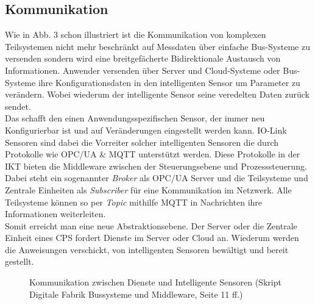 \documentclass[a4paper,12pt]{scrartcl}
\begin{document}
\subsection{Kommunikation}
Wie in Abb. 3 schon illustriert ist die Kommunikation von komplexen Teilsystemen nicht mehr beschränkt auf Messdaten über einfache Bus-Systeme zu versenden sondern wird eine breitgefächerte Bidirektionale Austausch von Informationen. Anwender versenden über Server und Cloud-Systeme oder Bus-Systeme ihre Konfigurationsdaten in den intelligenten Sensor um Parameter zu verändern. Wobei wiederum der intelligente Sensor seine veredelten Daten zurück sendet.\\
\cite[14 ff.]{Furstenberg.2016}
Das schafft den einen Anwendungsspezifischen Sensor, der immer neu Konfigurierbar ist und auf Veränderungen eingestellt werden kann. IO-Link Sensoren sind dabei die Vorreiter solcher intelligenten Sensoren die durch Protokolle wie OPC/UA \& MQTT unterstützt werden. Diese Protokolle in der IKT bieten die Middleware zwischen der Steuerungsebene und Prozesssteuerung. Dabei steht ein sogenannter \textit{Broker} als OPC/UA Server und die Teilsysteme und Zentrale Einheiten als \textit{Subscriber} für eine Kommunikation im Netzwerk. Alle Teilsysteme können so per \textit{Topic} mithilfe MQTT in Nachrichten ihre Informationen weiterleiten.\\
Somit erreicht man eine neue Abstraktionsebene. Der Server oder die Zentrale Einheit eines CPS fordert Dienste im Server oder Cloud an. Wiederum werden die Anweisungen verschickt, von intelligenten Sensoren bewältigt und bereit gestellt.\cite[Seite 3 ff.]{Pr.Dr.DerkRembold.15.02.2019}
\vspace{0.5cm}

\begin{figure}[H]
\centering
\begin{adjustbox}{max width=\textwidth}
\end{adjustbox}
  \caption{Kommunikation zwischen Dienste und Intelligente Sensoren (Skript Digitale Fabrik Bussysteme und Middleware, Seite 11 ff.)}
 \label{fig:Kommunikation zwischen Dienste und Intelligente Sensoren} 
\end{figure}
  
\end{document}
